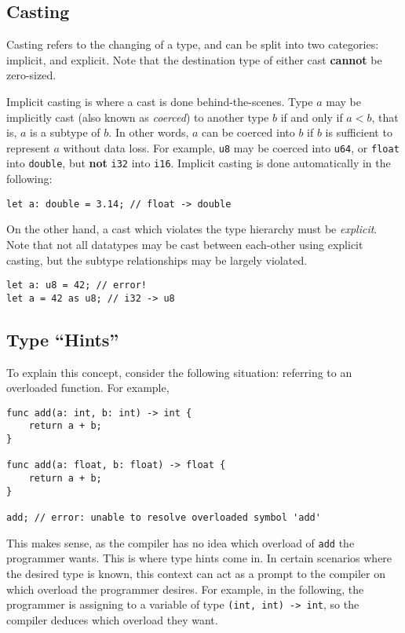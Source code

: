 \subsection{Casting}\label{subsec:type-casting}

Casting refers to the changing of a type, and can be split into two categories: implicit, and explicit.
Note that the destination type of either cast \textbf{cannot} be zero-sized.

Implicit casting is where a cast is done behind-the-scenes.
Type \(a\) may be implicitly cast (also known as \textit{coerced}) to another type \(b\) if and only if \(a < b\), that is, \(a\) is a subtype of \(b\).
In other words, \(a\) can be coerced into \(b\) if \(b\) is sufficient to represent \(a\) without data loss.
For example, \texttt{u8} may be coerced into \texttt{u64}, or \texttt{float} into \texttt{double}, but \textbf{not} \texttt{i32} into \texttt{i16}.
Implicit casting is done automatically in the following:

\begin{lstlisting}[language=CustomLang]
let a: double = 3.14; // float -> double
\end{lstlisting}

On the other hand, a cast which violates the type hierarchy must be \textit{explicit}.
Note that not all datatypes may be cast between each-other using explicit casting, but the subtype relationships may be largely violated.

\begin{lstlisting}[language=CustomLang]
let a: u8 = 42; // error!
let a = 42 as u8; // i32 -> u8
\end{lstlisting}

\subsection{Type ``Hints''}\label{subsec:type-hints}

To explain this concept, consider the following situation: referring to an overloaded function.
For example,

\begin{lstlisting}[language=CustomLang]
func add(a: int, b: int) -> int {
    return a + b;
}

func add(a: float, b: float) -> float {
    return a + b;
}

add; // error: unable to resolve overloaded symbol 'add'
\end{lstlisting}

This makes sense, as the compiler has no idea which overload of \texttt{add} the programmer wants.
This is where type hints come in.
In certain scenarios where the desired type is known, this context can act as a prompt to the compiler on which overload the programmer desires.
For example, in the following, the programmer is assigning to a variable of type \texttt{(int, int) -> int}, so the compiler deduces which overload they want.

